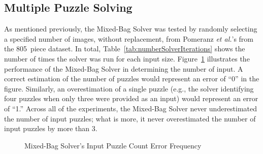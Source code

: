 \subsection{Multiple Puzzle Solving}

As mentioned previously, the Mixed-Bag Solver was tested by randomly selecting a specified number of images, without replacement, from Pomeranz \textit{et al.}'s  from the 805~piece dataset.  In total, Table~\ref{tab:numberSolverIterations} shows the number of times the solver was run for each input size. Figure~\ref{fig:inputPuzzleCountErrorFrequency} illustrates the performance of the Mixed-Bag Solver in determining the number of input.  A correct estimation of the number of puzzles would represent an error of ``0'' in the figure.  Similarly, an overestimation of a single puzzle (e.g., the solver identifying four puzzles when only three were provided as an input) would represent an error of ``1.''  Across all of the experiments, the Mixed-Bag Solver never underestimated the number of input puzzles; what is more, it never overestimated the number of input puzzles by more than 3.  

\begin{figure}
\begin{center}
\end{center}
\caption{Mixed-Bag Solver's Input Puzzle Count Error Frequency}
\label{fig:inputPuzzleCountErrorFrequency}
\end{figure}

